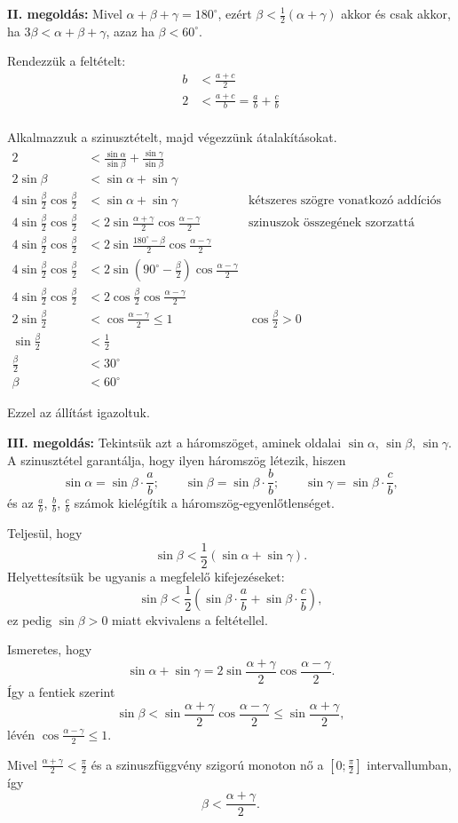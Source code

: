 \documentclass[a4paper,10pt]{article}
\begin{document}
\medskip

{\bf II. megoldás: } Mivel $\alpha+\beta+\gamma=180^\circ$, ezért $\beta<\frac12(\alpha+\gamma)$ akkor és csak akkor, ha $3\beta<\alpha+\beta+\gamma$, azaz ha $\beta<60^\circ$.

Rendezzük a feltételt:
\begin{align*}
b&<\frac{a+c}{2}\\
2&<\frac{a+c}{b}=\frac{a}{b}+\frac{c}{b}\\
\end{align*}

Alkalmazzuk a szinusztételt, majd végezzünk átalakításokat.
\begin{align*}
2&<\frac{\sin\alpha}{\sin\beta}+\frac{\sin\gamma}{\sin\beta}\\
2\sin\beta&<\sin\alpha+\sin\gamma\\
4\sin\frac{\beta}{2}\cos\frac{\beta}{2}&<\sin\alpha+\sin\gamma &\text{kétszeres szögre vonatkozó addíciós tétel}\\
4\sin\frac{\beta}{2}\cos\frac{\beta}{2}&<2\sin\frac{\alpha+\gamma}{2}\cos\frac{\alpha-\gamma}{2} &\text{szinuszok összegének szorzattá alakítása}\\
4\sin\frac{\beta}{2}\cos\frac{\beta}{2}&<2\sin\frac{180^\circ-\beta}{2}\cos\frac{\alpha-\gamma}{2}\\
4\sin\frac{\beta}{2}\cos\frac{\beta}{2}&<2\sin\left(90^\circ-\frac{\beta}{2}\right)\cos\frac{\alpha-\gamma}{2}\\
4\sin\frac{\beta}{2}\cos\frac{\beta}{2}&<2\cos\frac{\beta}{2}\cos\frac{\alpha-\gamma}{2}\\
2\sin\frac{\beta}{2}&<\cos\frac{\alpha-\gamma}{2}\le1 &\cos\frac{\beta}{2}>0\\
\sin\frac{\beta}{2}&<\frac12\\
\frac{\beta}{2}&<30^\circ\\
\beta&<60^\circ
\end{align*}

Ezzel az állítást igazoltuk.

\medskip

{\bf III. megoldás: } Tekintsük azt a háromszöget, aminek oldalai $\sin\alpha$, $\sin\beta$, $\sin\gamma$. A szinusztétel garantálja, hogy ilyen háromszög létezik, hiszen
\[\sin\alpha=\sin\beta\cdot\frac{a}{b};\qquad \sin\beta=\sin\beta\cdot\frac{b}{b};\qquad
\sin\gamma=\sin\beta\cdot\frac{c}{b},\]
és az $\frac{a}{b}$, $\frac{b}{b}$, $\frac{c}{b}$ számok kielégítik a háromszög-egyenlőtlenséget.

Teljesül, hogy 
\[\sin\beta<\frac12(\sin\alpha+\sin\gamma).\]
Helyettesítsük be ugyanis a megfelelő kifejezéseket:
\[\sin\beta<\frac12\left(\sin\beta\cdot\frac{a}{b}+\sin\beta\cdot\frac{c}{b}\right),\]
ez pedig $\sin\beta>0$ miatt ekvivalens a feltétellel.

Ismeretes, hogy
\[\sin\alpha+\sin\gamma=2\sin\frac{\alpha+\gamma}{2}\cos\frac{\alpha-\gamma}{2}.\]
Így a fentiek szerint
\[\sin\beta<\sin\frac{\alpha+\gamma}{2}\cos\frac{\alpha-\gamma}{2}\le\sin\frac{\alpha+\gamma}{2},\]
lévén $\cos\frac{\alpha-\gamma}{2}\le1$.

Mivel $\frac{\alpha+\gamma}{2}<\frac{\pi}{2}$ és a szinuszfüggvény szigorú monoton nő a $\left[0;\frac{\pi}{2}\right]$ intervallumban, így
\[\beta<\frac{\alpha+\gamma}{2}.\]
\end{document}
